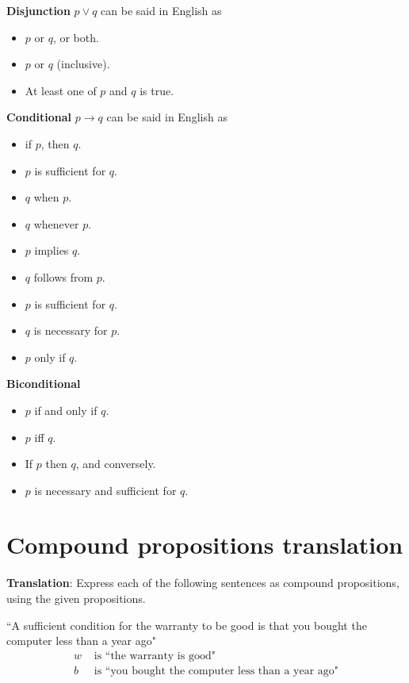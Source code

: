 \documentclass[12pt, oneside]{article}
\begin{document}
{\bf Disjunction} $p \lor q$ can be said in English as
\begin{itemize}
    \item $p$ or $q$, or both.
    \item $p$ or $q$ (inclusive).
    \item At least one of $p$ and $q$ is true.
\end{itemize}

{\bf Conditional} $p \to q$ can be said in English as
\begin{multicols}{2}
\begin{itemize}
    \item if $p$, then $q$.
    \item $p$ is sufficient for $q$.
    \item $q$ when $p$.
    \item $q$ whenever $p$.
    \item $p$ implies $q$.
    \item $q$ follows from $p$.
    \item $p$ is sufficient for $q$.
    \item $q$ is necessary for $p$.
    \item $p$ only if $q$.
\end{itemize}
\end{multicols}

{\bf Biconditional}
\begin{itemize}
    \item $p$ if and only if $q$.
    \item $p$ iff $q$.
    \item If $p$ then $q$, and conversely.
    \item $p$ is necessary and sufficient for $q$.
\end{itemize} \vfill
\section*{Compound propositions translation}


{\bf Translation}: Express each of the following sentences as compound propositions, using
the given propositions.

\begin{multicols}{2}
``A sufficient condition for the warranty to be good is that you bought the computer less than a year ago"
\columnbreak
\begin{align*}
w &\text{ is  ``the warranty is good"} \\
b &\text{ is  ``you bought the computer less than a year ago"} \\
\end{align*}
\end{multicols}
\vfill
\end{document}
